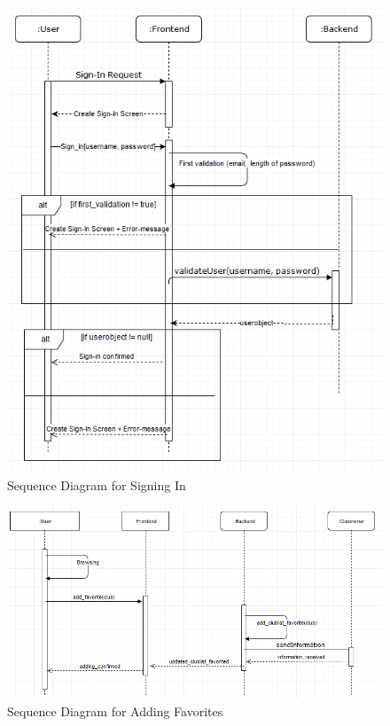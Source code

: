 \documentclass[12pt]{article}
\begin{document}
\begin{figure}[H]
  \centering
    \includegraphics[width=1\textwidth]{figures/SequenceDiagram1.png}
    \caption{Sequence Diagram for Signing In }
\end{figure}

\begin{figure}[H]
  \centering
    \includegraphics[width=1\textwidth]{figures/SequenceDiagram2.png}
    \caption{Sequence Diagram for Adding Favorites }
\end{figure}
\end{document}
